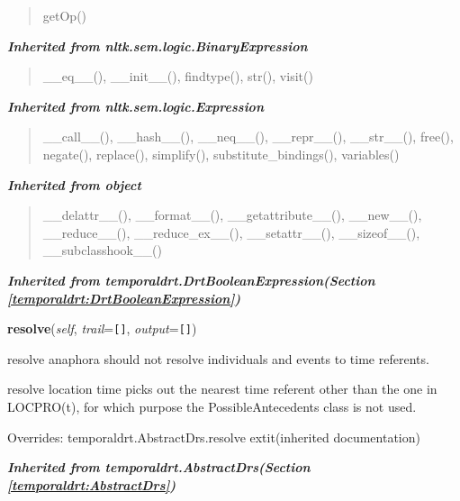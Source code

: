 \begin{quote}
getOp()
\end{quote}

\large{\textbf{\textit{Inherited from nltk.sem.logic.BinaryExpression}}}

\begin{quote}
\_\_eq\_\_(), \_\_init\_\_(), findtype(), str(), visit()
\end{quote}

\large{\textbf{\textit{Inherited from nltk.sem.logic.Expression}}}

\begin{quote}
\_\_call\_\_(), \_\_hash\_\_(), \_\_neq\_\_(), \_\_repr\_\_(), \_\_str\_\_(), free(), negate(), replace(), simplify(), substitute\_bindings(), variables()
\end{quote}

\large{\textbf{\textit{Inherited from object}}}

\begin{quote}
\_\_delattr\_\_(), \_\_format\_\_(), \_\_getattribute\_\_(), \_\_new\_\_(), \_\_reduce\_\_(), \_\_reduce\_ex\_\_(), \_\_setattr\_\_(), \_\_sizeof\_\_(), \_\_subclasshook\_\_()
\end{quote}

\large{\textbf{\textit{Inherited from temporaldrt.DrtBooleanExpression\textit{(Section \ref{temporaldrt:DrtBooleanExpression})}}}}

    \vspace{0.5ex}

\hspace{.8\funcindent}\begin{boxedminipage}{\funcwidth}

    \raggedright \textbf{resolve}(\textit{self}, \textit{trail}={\tt \texttt{[}\texttt{]}}, \textit{output}={\tt \texttt{[}\texttt{]}})

\setlength{\parskip}{2ex}
    resolve anaphora should not resolve individuals and events to time 
    referents.

    resolve location time picks out the nearest time referent other than 
    the one in LOCPRO(t), for which purpose the PossibleAntecedents class 
    is not used.

\setlength{\parskip}{1ex}
      Overrides: temporaldrt.AbstractDrs.resolve 	extit{(inherited documentation)}

    \end{boxedminipage}


\large{\textbf{\textit{Inherited from temporaldrt.AbstractDrs\textit{(Section \ref{temporaldrt:AbstractDrs})}}}}

